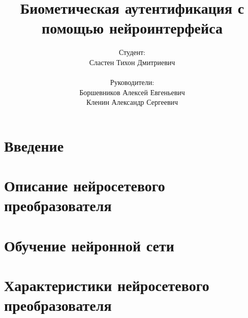 \documentclass{beamer}
\title{Биометическая аутентификация с помощью нейроинтерфейса}
\author{
    Студент: \\ Сластен Тихон Дмитриевич \\ \\
    Руководители: \\ Боршевников Алексей Евгеньевич \\ Кленин Александр Сергеевич}
\institute{Б8303а Прикладная математика и информатика}
\date{}
\begin{document}
\maketitle

\section{Введение}






\section{Описание нейросетевого преобразователя}




\section{Обучение нейронной сети}



\section{Характеристики нейросетевого преобразователя}

\end{document}
